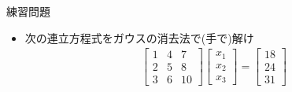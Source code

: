 \begin{frame}[t,fragile]{練習問題}
  \begin{itemize}
  \item 次の連立方程式をガウスの消去法で(手で)解け
    \begin{align*}
      \begin{bmatrix} 1 & 4 & 7 \\ 2 & 5 & 8 \\ 3 & 6 & 10 \end{bmatrix} \begin{bmatrix} x_1 \\ x_2 \\ x_3 \end{bmatrix} = \begin{bmatrix} 18 \\ 24 \\ 31 \end{bmatrix}
    \end{align*}
  \end{itemize}
\end{frame}
